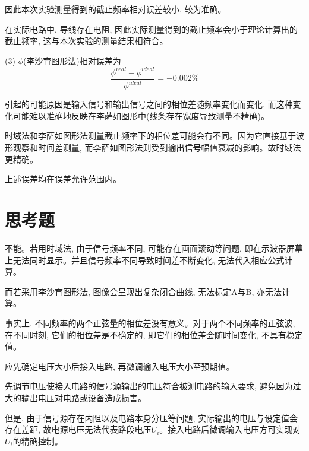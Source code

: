 \documentclass[a4paper]{article}
\begin{document}
    {因此本次实验测量得到的截止频率相对误差较小, 较为准确。}

    {在实际电路中, 导线存在电阻, 因此实际测量得到的截止频率会小于理论计算出的截止频率, 这与本次实验的测量结果相符合。}

    {(3) $\phi$(李沙育图形法)相对误差为\[\frac{\phi^{real}-\phi^{ideal}}{\phi^{ideal}}=-0.002\%\]}

    {引起的可能原因是输入信号和输出信号之间的相位差随频率变化而变化, 而这种变化可能难以准确地反映在李萨如图形中(线条存在宽度导致测量不精确)。}

    {时域法和李萨如图形法测量截止频率下的相位差可能会有不同。因为它直接基于波形观察和时间差测量, 而李萨如图形法则受到输出信号幅值衰减的影响。故时域法更精确。}

    {上述误差均在误差允许范围内。}

    \vspace{1.7cm}


    \section{\textbf{思考题}}\label{sec:textbf}


    {不能。若用时域法, 由于信号频率不同, 可能存在画面滚动等问题, 即在示波器屏幕上无法同时显示。并且信号频率不同导致时间差不断变化, 无法代入相应公式计算。}

    {而若采用李沙育图形法, 图像会呈现出复杂闭合曲线, 无法标定A与B, 亦无法计算。}

    {事实上, 不同频率的两个正弦量的相位差没有意义。对于两个不同频率的正弦波, 在不同时刻, 它们的相位差是不确定的, 即它们的相位差会随时间变化, 不具有稳定值。}


    {应先确定电压大小后接入电路, 再微调输入电压大小至预期值。}

    {先调节电压使接入电路的信号源输出的电压符合被测电路的输入要求, 避免因为过大的输出电压对电路或设备造成损害。}

    {但是, 由于信号源存在内阻以及电路本身分压等问题, 实际输出的电压与设定值会存在差距, 故电源电压无法代表路段电压$U_{i}$。接入电路后微调输入电压方可实现对$U_{i}$的精确控制。}

\end{document}
